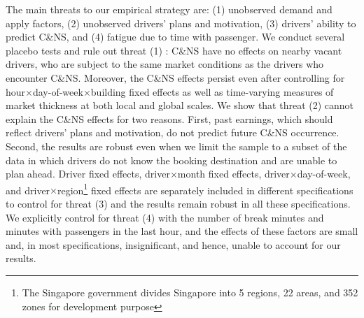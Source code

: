 \documentclass[reviewmode,AEJ]{AEA}
\begin{document}
The main threats to our empirical strategy are: (1) unobserved demand and apply factors, (2) unobserved drivers' plans and motivation, (3) drivers' ability to predict C\&NS, and (4) fatigue due to time with passenger.
We conduct several placebo tests and rule out threat (1)%
: C\&NS have no effects on nearby vacant drivers, who are subject to the same market conditions as the drivers who encounter C\&NS. Moreover, the C\&NS effects persist even after controlling for hour\(\times\)day-of-week\(\times\)building fixed effects as well as time-varying measures of market thickness at both local and global scales. We show that threat (2) %
cannot explain the C\&NS effects for two reasons. First, past earnings, which should reflect drivers' plans and motivation, do not predict future C\&NS occurrence. Second, the results are robust even when we limit the sample to a subset of the data in which drivers do not know the booking destination and are unable to plan ahead. Driver fixed effects, driver\(\times\)month fixed effects, driver\(\times\)day-of-week, and driver\(\times\)region\footnote {The Singapore government divides Singapore into 5 regions, 22 areas, and 352 zones for development purpose} fixed effects are separately included in different specifications to control for threat (3) %
and the results remain robust in all these specifications. We explicitly control for threat (4) %
with the number of break minutes and minutes with passengers in the last hour, and the effects of these factors are small and, in most specifications, insignificant, and hence, unable to account for our results.



\end{document}
